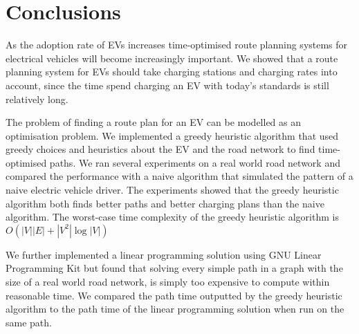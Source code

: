 \section{Conclusions}
As the adoption rate of EVs increases time-optimised route planning systems for electrical vehicles will become increasingly important. 
We showed that a route planning system for EVs should take charging stations and charging rates into account, since the time spend 
charging an EV with today's standards is still relatively long. 

The problem of finding a route plan for an EV can be modelled as an optimisation problem. We implemented a greedy heuristic algorithm that used greedy choices and heuristics about the EV and the road network to find time-optimised paths. We ran several experiments on a real world road network and compared the performance with a naive algorithm that simulated the pattern of a naive electric vehicle driver. The experiments showed that the greedy heuristic algorithm both finds better paths and better charging plans than the naive algorithm. The worst-case time complexity of the greedy heuristic algorithm is $O(|V||E|+|V^2|\log|V|)$

We further implemented a linear programming solution using GNU Linear Programming Kit but found that solving every simple path in a graph with the size of a real world road network, is simply too expensive to compute within reasonable time. We compared the path time outputted by the greedy heuristic algorithm to the path time of the linear programming solution when run on the same path. 
  